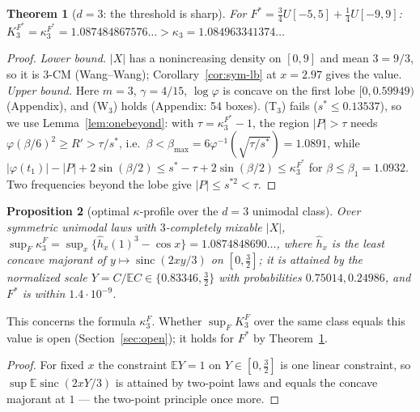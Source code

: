 \documentclass[11pt]{amsart}
\newtheorem{theorem}{Theorem}[section]\newtheorem{proposition}[theorem]{Proposition}\newtheorem{lemma}[theorem]{Lemma}
\theoremstyle{definition}\newtheorem{definition}[theorem]{Definition}\theoremstyle{remark}\newtheorem{remark}[theorem]{Remark}
\newcommand{\sinc}{\operatorname{sinc}}\newcommand{\E}{\mathbb E}\newcommand{\cx}{\le_{\mathrm{cx}}}
\begin{document}
\begin{theorem}[$d=3$: the threshold is sharp]\label{thm:d3}
For $F^*=\frac34U[-5,5]+\frac14U[-9,9]$: $K_3^{F^*}=\kappa_3^{F^*}=1.087484867576\ldots>\kappa_3=1.084963341374\ldots$
\end{theorem}
\begin{proof}\emph{Lower bound.} $|X|$ has a nonincreasing density on $[0,9]$ and mean $3=9/3$, so it is $3$-CM (Wang--Wang); Corollary~\ref{cor:sym-lb} at $x=2.97$ gives the value.
\emph{Upper bound.} Here $m=3$, $\gamma=4/15$, $\log\varphi$ is concave on the first lobe $[0,0.59949)$ (Appendix), and (W$_3$) holds (Appendix: 54 boxes). (T$_3$) fails
($s^*\le0.13537$), so we use Lemma~\ref{lem:onebeyond}: with $\tau=\kappa_3^{F^*}-1$, the region $|P|>\tau$ needs $\varphi(\beta/6)^2\ge R'>\tau/s^*$, i.e.\ $\beta<\beta_{\max}=6\varphi^{-1}(\sqrt{\tau/s^*})=1.0891$,
while $|\varphi(t_1)|-|P|+2\sin(\beta/2)\le s^*-\tau+2\sin(\beta/2)\le\kappa_3^{F^*}$ for $\beta\le\beta_1=1.0932$. Two frequencies beyond the lobe give $|P|\le s^{*2}<\tau$.\end{proof}
\begin{proposition}[optimal $\kappa$-profile over the $d=3$ unimodal class]\label{prop:d3sup}
Over symmetric unimodal laws with $3$-completely mixable $|X|$, $\sup_F\kappa_3^F=\sup_x\{\hat h_x(1)^3-\cos x\}=1.0874848690\ldots$, where $\hat h_x$ is the least concave majorant
of $y\mapsto\sinc(2xy/3)$ on $[0,\frac32]$; it is attained by the normalized scale $Y=C/\E C\in\{0.83346,\frac32\}$ with probabilities $0.75014,0.24986$, and $F^*$ is within $1.4\cdot10^{-9}$.
\end{proposition}
\noindent This concerns the formula $\kappa_3^F$. Whether $\sup_FK_3^F$ over the same class equals this value is open (Section~\ref{sec:open}); it holds for $F^*$
by Theorem~\ref{thm:d3}.
\begin{proof}For fixed $x$ the constraint $\E Y=1$ on $Y\in[0,\frac32]$ is one linear constraint, so $\sup\E\sinc(2xY/3)$ is attained by two-point laws and equals the concave majorant at
$1$ --- the two-point principle once more.\end{proof}
\end{document}
